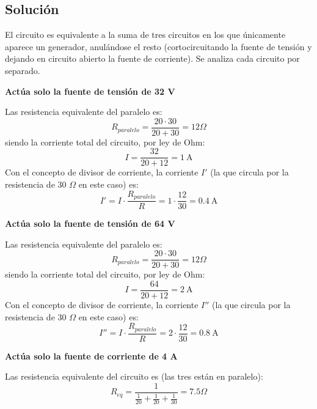 \subsection*{Solución}
El circuito es equivalente a la suma de tres circuitos en los que
únicamente aparece un generador, anulándose el resto (cortocircuitando
la fuente de tensión y dejando en circuito abierto la fuente de
corriente). Se analiza cada circuito por separado.

\textbf{Actúa solo la fuente de tensión de 32 V}

Las resistencia equivalente del paralelo es:
\begin{equation*}
  R_{paralelo}=\dfrac{20\cdot 30}{20+30}=12\Omega
\end{equation*}
siendo la corriente total del circuito, por ley de Ohm:
\begin{equation*}
  I=\dfrac{32}{20+12}=\qty{1}{\ampere}
\end{equation*}
Con el concepto de divisor de corriente, la corriente $I'$ (la que
circula por la resistencia de 30 $\Omega$ en este caso) es:
\begin{equation*}
  I'=I\cdot \dfrac{R_{paralelo}}{R}=1\cdot\dfrac{12}{30}=\qty{0.4}{\ampere}
\end{equation*}

\textbf{Actúa solo la fuente de tensión de 64 V}

Las resistencia equivalente del paralelo es:
\begin{equation*}
  R_{paralelo}=\dfrac{20\cdot 30}{20+30}=12\Omega
\end{equation*}
siendo la corriente total del circuito, por ley de Ohm:
\begin{equation*}
  I=\dfrac{64}{20+12}=\qty{2}{\ampere}
\end{equation*}
Con el concepto de divisor de corriente, la corriente $I''$ (la que
circula por la resistencia de 30 $\Omega$ en este caso) es:
\begin{equation*}
  I''=I\cdot \dfrac{R_{paralelo}}{R
  }=2\cdot\dfrac{12}{30}=\qty{0.8}{\ampere}
\end{equation*}

\textbf{Actúa solo la fuente de corriente de 4 A}

Las resistencia equivalente del circuito es (las tres están en
paralelo):
\begin{equation*}
  R_{eq}=\dfrac{1}{\frac{1}{20}+\frac{1}{20}+\frac{1}{30}}=7.5\Omega
\end{equation*}

